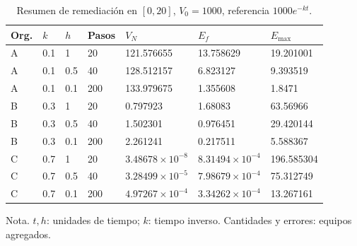 \begin{table}[H]\centering\small\setlength{\tabcolsep}{4pt}
\caption{Resumen de remediación en $[0,20]$, $V_0=1000$, referencia $1000e^{-kt}$.}\label{tab:vulnerabilidadesresumen}
\begin{tabular}{lllllll}
\toprule
Org. & $k$ & $h$ & Pasos & $V_N$ & $E_f$ & $E_{\max}$\\
\midrule
A & 0.1 & 1 & 20 & 121.576655 & 13.758629 & 19.201001\\
A & 0.1 & 0.5 & 40 & 128.512157 & 6.823127 & 9.393519\\
A & 0.1 & 0.1 & 200 & 133.979675 & 1.355608 & 1.8471\\
B & 0.3 & 1 & 20 & 0.797923 & 1.68083 & 63.56966\\
B & 0.3 & 0.5 & 40 & 1.502301 & 0.976451 & 29.420144\\
B & 0.3 & 0.1 & 200 & 2.261241 & 0.217511 & 5.588367\\
C & 0.7 & 1 & 20 & $3.48678\times 10^{-8}$ & $8.31494\times 10^{-4}$ & 196.585304\\
C & 0.7 & 0.5 & 40 & $3.28499\times 10^{-5}$ & $7.98679\times 10^{-4}$ & 75.312749\\
C & 0.7 & 0.1 & 200 & $4.97267\times 10^{-4}$ & $3.34262\times 10^{-4}$ & 13.267161\\
\bottomrule\end{tabular}
\end{table}
{\footnotesize Nota. $t,h$: unidades de tiempo; $k$: tiempo inverso. Cantidades y errores: equipos agregados.}
